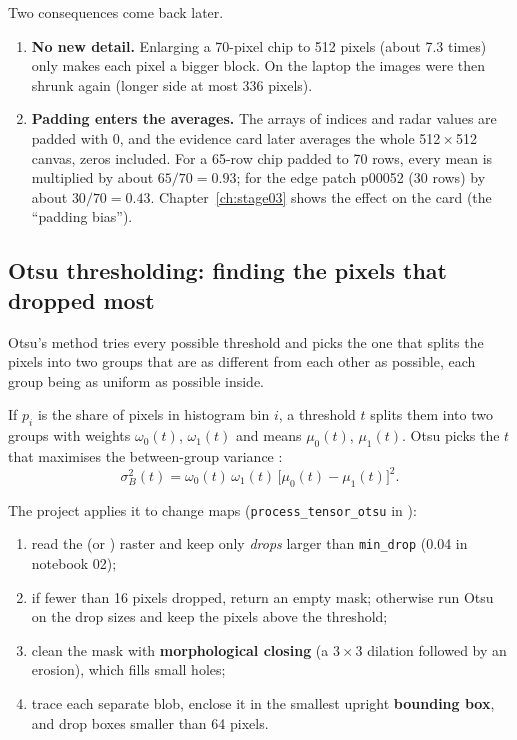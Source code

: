 \begin{watchout}
Two consequences come back later.
\begin{enumerate}
  \item \textbf{No new detail.} Enlarging a 70-pixel chip to 512 pixels (about 7.3 times) only makes each pixel a bigger block. On the laptop the images were then shrunk again (longer side at most 336 pixels).
  \item \textbf{Padding enters the averages.} The arrays of indices and radar values are padded with 0, and the evidence card later averages the whole 512\,$\times$\,512 canvas, zeros included. For a 65-row chip padded to 70 rows, every mean is multiplied by about $65/70 = 0.93$; for the edge patch p00052 (30 rows) by about $30/70 = 0.43$. Chapter~\ref{ch:stage03} shows the effect on the card (the ``padding bias'').
\end{enumerate}
\end{watchout}

\subsection{Otsu thresholding: finding the pixels that dropped most}

\begin{plainwords}
Otsu's method tries every possible threshold and picks the one that splits the pixels into two groups that are as different from each other as possible, each group being as uniform as possible inside.
\end{plainwords}

If $p_i$ is the share of pixels in histogram bin $i$, a threshold $t$ splits them into two groups with weights $\omega_0(t)$, $\omega_1(t)$ and means $\mu_0(t)$, $\mu_1(t)$. Otsu picks the $t$ that maximises the between-group variance \citep{otsu1979}:
\begin{equation}
\sigma_B^2(t) = \omega_0(t)\,\omega_1(t)\,\bigl[\mu_0(t)-\mu_1(t)\bigr]^2 .
\label{eq:otsu}
\end{equation}

The project applies it to change maps (\texttt{process\_tensor\_otsu} in ):
\begin{enumerate}
  \item read the \dndvi{} (or \dnbr) raster and keep only \emph{drops} larger than \texttt{min\_drop} (0.04 in notebook 02);
  \item if fewer than 16 pixels dropped, return an empty mask; otherwise run Otsu on the drop sizes and keep the pixels above the threshold;
  \item clean the mask with \textbf{morphological closing} (a 3\,$\times$\,3 dilation followed by an erosion), which fills small holes;
  \item trace each separate blob, enclose it in the smallest upright \textbf{bounding box}, and drop boxes smaller than 64 pixels.
\end{enumerate}

